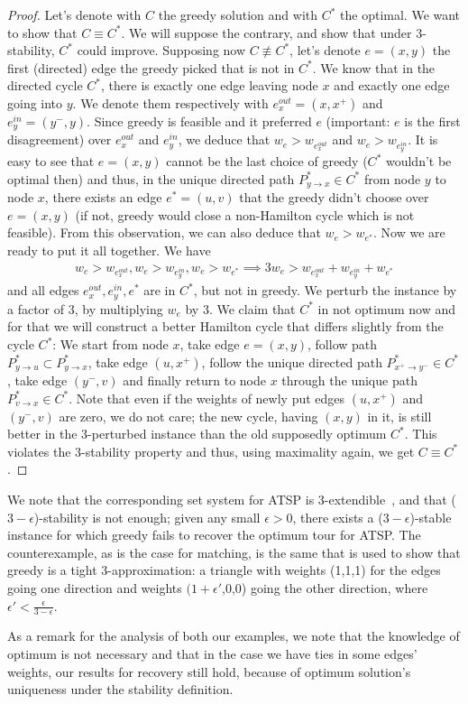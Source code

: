\begin{proof}
Let's denote with $C$ the greedy solution and with $C^*$ the optimal. We want to show that $C\equiv C^*$. We will suppose the contrary, and show that under 3-stability, $C^*$ could improve. Supposing now $C\not\equiv C^*$, let's denote $e=(x,y)$ the first (directed) edge the greedy picked that is not in $C^*$. We know that in the directed cycle $C^*$, there is exactly one edge leaving node $x$ and exactly one edge going into $y$. We denote them respectively with $e_x^{out}=(x,x^+)$ and $e_y^{in}=(y^-,y)$. Since greedy is feasible and it preferred $e$ (important: $e$ is the first disagreement) over $e_x^{out}$ and $e_y^{in}$, we deduce that $w_e > w_{e_x^{out}}$ and $w_e > w_{e_y^{in}}$. It is easy to see that $e=(x,y)$ cannot be the last choice of greedy ($C^*$ wouldn't be optimal then) and thus, in the unique directed path $P_{y\rightarrow x}^* \in C^*$ from node $y$ to node $x$, there exists an edge $e^*=(u,v)$ that the greedy didn't choose over $e=(x,y)$ (if not, greedy would close a non-Hamilton cycle which is not feasible). From this observation, we can also deduce that $w_e > w_{e^*}$. Now we are ready to put it all together. We have 
\begin{align*}
w_e > w_{e_x^{out}}, w_e > w_{e_y^{in}}, w_e > w_{e^*} \implies 3w_e > w_{e_x^{out}}+ w_{e_y^{in}}+ w_{e^*}
\end{align*}
and all edges  $e_x^{out}, e_y^{in}, e^*$ are in $C^*$, but not in greedy. We perturb the instance by a factor of 3, by multiplying $w_e$ by 3. We claim that $C^*$ in not optimum now and for that we will construct a better Hamilton cycle that differs slightly from the cycle $C^*$: We start from node $x$, take edge $e=(x,y)$, follow path $P_{y\rightarrow u}^* \subset P_{y\rightarrow x}^*$, take edge $(u,x^+)$, follow the unique directed path $P_{x^+\rightarrow y^-}^* \in C^*$, take edge $(y^-,v)$ and finally return to node $x$ through the unique path $P_{v\rightarrow x}^* \in C^*$. Note that even if the weights of newly put edges $(u,x^+)$ and $(y^-,v)$ are zero, we do not care; the new cycle, having $(x,y)$ in it, is still better in the 3-perturbed instance than the old supposedly optimum $C^*$. This violates the 3-stability property and thus, using maximality again, we get $C\equiv C^*$.
\end{proof}

We note that the corresponding set system for ATSP is 3-extendible~\cite{mestre2006greedy}, and that ($3-\epsilon$)-stability is not enough; given any small $\epsilon>0$, there exists a ($3-\epsilon$)-stable instance for which greedy fails to recover the optimum tour for ATSP. The counterexample, as is the case for matching, is the same that is used to show that greedy is a tight 3-approximation: a triangle with weights (1,1,1) for the edges going one direction and weights $(1+\epsilon'$,0,0) going the other direction, where $\epsilon'<\tfrac{\epsilon}{3-\epsilon}$.

As a remark for the analysis of both our examples, we note that the knowledge of optimum is not necessary and that in the case we have ties in some edges' weights, our results for recovery still hold, because of optimum solution's uniqueness under the stability definition.

